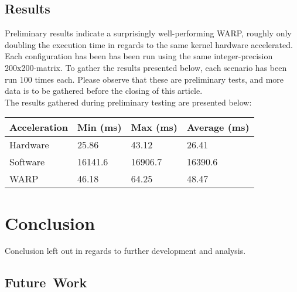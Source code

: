 \documentclass[fleqn,10pt]{SelfArx} %
\begin{document}
\subsection{Results}
\label{sec:contribution:results}
Preliminary results indicate a surprisingly well-performing WARP, roughly only doubling the execution time in regards to the same kernel hardware accelerated. Each configuration has been has been run using the same integer-precision 200x200-matrix. To gather the results presented below, each scenario has been run 100 times each. Please observe that these are preliminary tests, and more data is to be gathered before the closing of this article. \\
The results gathered during preliminary testing are presented below:
\begin{center}
	\begin{tabular}{| l | l | l | l |}
	\hline
	Acceleration & Min (ms) & Max (ms) & Average (ms)	\\ \hline
	Hardware & 25.86  & 43.12  & 26.41			\\ \hline
	Software & 16141.6 & 16906.7 & 16390.6		\\ \hline
	WARP & 46.18 & 64.25 & 48.47				\\
	\hline
	\end{tabular}
\end{center}


\section{Conclusion}
\label{sec:conclusion}
Conclusion left out in regards to further development and analysis.

\subsection{Future~Work}
\label{sec:conclusion:futurework}
\end{document}
